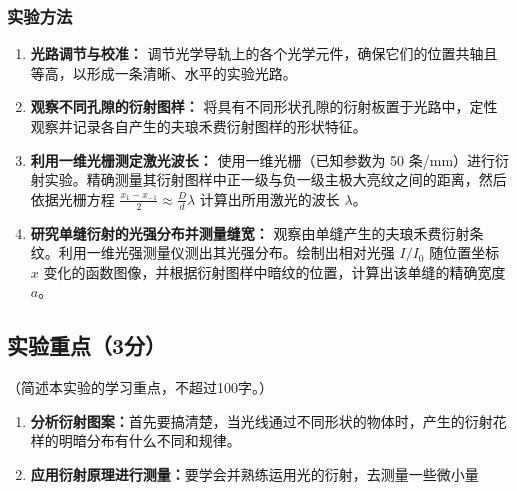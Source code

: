 \documentclass[]{../../templates/Report}%
\begin{document}
\subsubsection{实验方法}
\begin{enumerate}
    \item \textbf{光路调节与校准：}
    调节光学导轨上的各个光学元件，确保它们的位置共轴且等高，以形成一条清晰、水平的实验光路。

    \item \textbf{观察不同孔隙的衍射图样：}
    将具有不同形状孔隙的衍射板置于光路中，定性观察并记录各自产生的夫琅禾费衍射图样的形状特征。

    \item \textbf{利用一维光栅测定激光波长：}
    使用一维光栅（已知参数为 50 条/\si{\mm}）进行衍射实验。精确测量其衍射图样中正一级与负一级主极大亮纹之间的距离，然后依据光栅方程 $\frac{x_1 - x_{-1}}{2} \approx \frac{D}{d}\lambda$ 计算出所用激光的波长 $\lambda$。

    \item \textbf{研究单缝衍射的光强分布并测量缝宽：}
    观察由单缝产生的夫琅禾费衍射条纹。利用一维光强测量仪测出其光强分布。绘制出相对光强 $I/I_0$ 随位置坐标 $x$ 变化的函数图像，并根据衍射图样中暗纹的位置，计算出该单缝的精确宽度 $a$。

\end{enumerate}
\subsection{实验重点（3分）}
（简述本实验的学习重点，不超过100字。）
\begin{enumerate}
    \item \textbf{分析衍射图案：}首先要搞清楚，当光线通过不同形状的物体时，产生的衍射花样的明暗分布有什么不同和规律。
    \item \textbf{应用衍射原理进行测量：}要学会并熟练运用光的衍射，去测量一些微小量
\end{enumerate}
\end{document}
